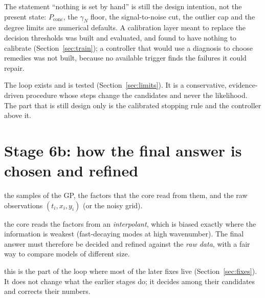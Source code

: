 \documentclass[11pt,a4paper]{article}
\theoremstyle{definition}
\newcommand{\sectionbrief}[3]{\begin{leadin}\begin{description}[nosep,leftmargin=3.0cm,labelwidth=2.8cm]
  \item[Starting from] #1
  \item[Why this section] #2
  \item[Role in the paper] #3
  \end{description}\end{leadin}}
\begin{document}
\begin{caution}[title=What is still not true of the loop]
The statement ``nothing is set by hand'' is still the design intention, not the present state: $P_{\mathrm{conc}}$, the $\gamma_N$ floor, the signal-to-noise cut, the outlier cap and the degree limits are numerical defaults. A calibration layer meant to replace the decision thresholds was built and evaluated, and found to have nothing to calibrate (Section~\ref{sec:train}); a controller that would use a diagnosis to choose remedies was not built, because no available trigger finds the failures it could repair.
\end{caution}

\begin{takeaway}
The loop exists and is tested (Section~\ref{sec:limits}). It is a conservative, evidence-driven procedure whose steps change the candidates and never the likelihood. The part that is still design only is the calibrated stopping rule and the controller above it.
\end{takeaway}



\section{Stage 6b: how the final answer is chosen and refined}\label{sec:refine}
\sectionbrief
{the samples of the GP, the factors that the core read from them, and the raw observations $(t_i,x_i,y_i)$ (or the noisy grid).}
{the core reads the factors from an \emph{interpolant}, which is biased exactly where the information is weakest (fast-decaying modes at high wavenumber). The final answer must therefore be decided and refined against the \emph{raw data}, with a fair way to compare models of different size.}
{this is the part of the loop where most of the later fixes live (Section~\ref{sec:fixes}). It does not change what the earlier stages do; it decides among their candidates and corrects their numbers.}
\end{document}
